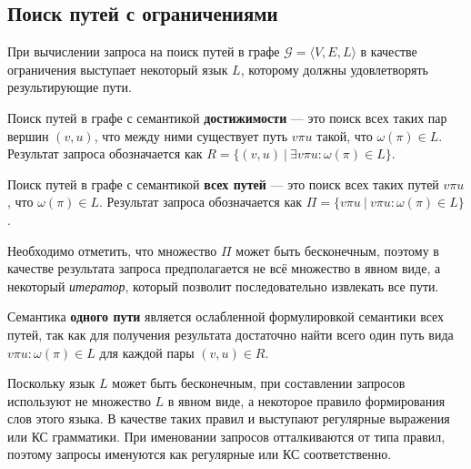 
\subsection{Поиск путей с ограничениями}

При вычислении запроса на поиск путей в графе $\mathcal{G} = \langle V, E, L \rangle$ в качестве ограничения выступает некоторый язык $L$, которому должны удовлетворять результирующие пути.

Поиск путей в графе с семантикой \textbf{достижимости} --- это поиск всех таких пар вершин $(v,u)$, что между ними существует путь $v \pi u$ такой, что $\omega (\pi) \in L$. Результат запроса обозначается как $R = \{ (v,u)~|~\exists v \pi u : \omega (\pi) \in L \}$.

Поиск путей в графе с семантикой \textbf{всех путей} --- это поиск всех таких путей $v \pi u$,   что $\omega (\pi) \in L$. Результат запроса обозначается как $\Pi = \{ v \pi u~|~v \pi u : \omega (\pi) \in L \}$.

Необходимо отметить, что множество $\Pi$ может быть бесконечным, поэтому в качестве результата запроса предполагается не всё множество в явном виде, а некоторый \textit{итератор}, который позволит последовательно извлекать все пути.

Семантика \textbf{одного пути} является ослабленной формулировкой семантики всех путей, так как для получения результата достаточно найти всего один путь вида $v \pi u : \omega (\pi) \in L$ для каждой пары $(v, u) \in R$.

Поскольку язык $L$ может быть бесконечным, при составлении запросов используют не множество $L$ в явном виде, а некоторое правило формирования слов этого языка. В качестве таких правил и выступают регулярные выражения или КС грамматики. При именовании запросов отталкиваются от типа правил, поэтому запросы именуются как регулярные или КС соответственно.

